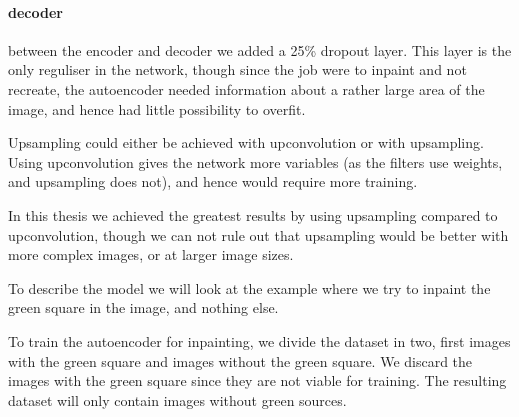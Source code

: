 \paragraph{decoder}
between the encoder and decoder we added a 25\% dropout layer. This layer is the only reguliser in the network, though since the job were to inpaint and not recreate, the autoencoder needed information about a rather large area of the image, and hence had little possibility to overfit.

Upsampling could either be achieved with upconvolution or with upsampling.
Using upconvolution gives the network more variables (as the filters use weights, and upsampling does not), and hence would require more training. 

In this thesis we achieved the greatest results by using upsampling compared to upconvolution, though we can not rule out that upsampling would be better with more complex images, or at larger image sizes.

\vspace{5px}

To describe the model we will look at the example where we try to inpaint the green square in the image, and nothing else.

To train the autoencoder for inpainting, we divide the dataset in two, first images with the green square and images without the green square. We discard the images with the green square since they are not viable for training. 
The resulting dataset will only contain images without green sources.

